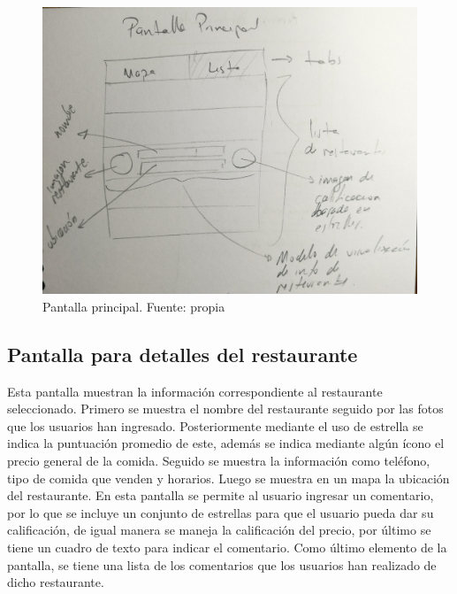 \documentclass[12pt,letterpaper]{article}
\begin{document}
\begin{figure}[h!]
	\begin{center}
		\includegraphics[scale=0.07]{pantalla_principal.jpg}
		\caption{Pantalla principal. Fuente: propia}
		\label{img:pantalla_principal}
	\end{center}
\end{figure}

\subsection{Pantalla para detalles del restaurante}
Esta pantalla muestran la información correspondiente al restaurante seleccionado. Primero se muestra el nombre del restaurante seguido por las fotos que los usuarios han ingresado. Posteriormente mediante el uso de estrella se indica la puntuación promedio de este, además se indica mediante algún ícono el precio general de la comida. Seguido se muestra la información como teléfono, tipo de comida que venden y horarios. Luego se muestra en un mapa la ubicación del restaurante. En esta pantalla se permite al usuario ingresar un comentario, por lo que se incluye un conjunto de estrellas para que el usuario pueda dar su calificación, de igual manera se maneja la calificación del precio, por último se tiene un cuadro de texto para indicar el comentario. Como último elemento de la pantalla, se tiene una lista de los comentarios que los usuarios han realizado de dicho restaurante.
\end{document}
